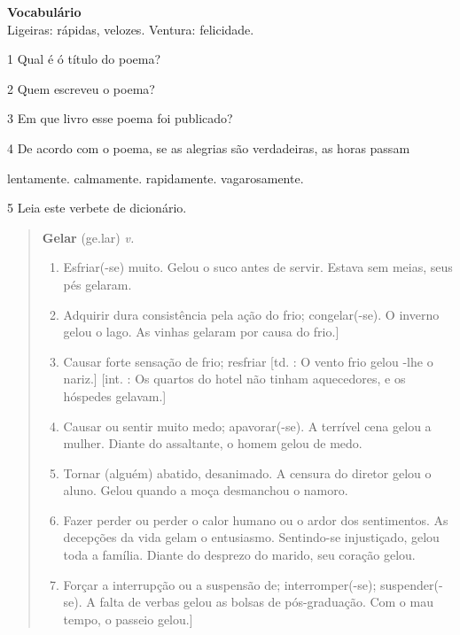 \textbf{Vocabulário}\\
Ligeiras: rápidas, velozes.
Ventura: felicidade.

\num{1} Qual é ó título do poema?


\num{2} Quem escreveu o poema?


\num{3} Em que livro esse poema foi publicado?


\num{4} De acordo com o poema, se as alegrias são verdadeiras, as horas passam

\begin{boxlist}
   lentamente.
   calmamente.
   rapidamente.
   vagarosamente.
\end{boxlist}

\num{5} Leia este verbete de dicionário.

\begin{quote}
\textbf{Gelar} (ge.lar)
\textit{v.}

\begin{enumerate}
\item Esfriar(-se) muito.
Gelou o suco antes de servir.
Estava sem meias, seus pés gelaram.

\item Adquirir dura consistência pela ação do frio; congelar(-se).
O inverno gelou o lago.
As vinhas gelaram por causa do frio.]

\item Causar forte sensação de frio; resfriar [td. : O vento frio gelou -lhe o nariz.] [int. : Os quartos do hotel não tinham aquecedores, e os hóspedes gelavam.]

\item Causar ou sentir muito medo; apavorar(-se).
A terrível cena gelou a mulher.
Diante do assaltante, o homem gelou de medo.

\item Tornar (alguém) abatido, desanimado.
A censura do diretor gelou o aluno.
Gelou quando a moça desmanchou o namoro.

\item Fazer perder ou perder o calor humano ou o ardor dos sentimentos.
As decepções da vida gelam o entusiasmo.
Sentindo-se injustiçado, gelou toda a família.
Diante do desprezo do marido, seu coração gelou.

\item Forçar a interrupção ou a suspensão de; interromper(-se); suspender(-se).
A falta de verbas gelou as bolsas de pós-graduação.
Com o mau tempo, o passeio gelou.]
\end{enumerate}

\end{quote}

